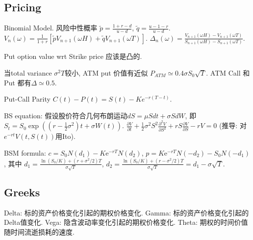 \documentclass[UTF8]{ctexart}
\begin{document}
\subsection{Pricing}

Binomial Model.
风险中性概率 $\widetilde{p} = \frac{1+r-d}{u-d}$, $\widetilde{q} = \frac{u-1-r}{u-d}$.
$V_n(\omega)=\frac{1}{1+r}[\widetilde{p}V_{n+1}(\omega H) + \widetilde{q}V_{n+1}(\omega T)]$.
$\Delta_n(\omega) = \frac{V_{n+1}(\omega H)-V_{n+1}(\omega T)}{S_{n+1}(\omega H)-S_{n+1}(\omega T)}$.


Put option value wrt Strike price 应该是凸的.

当total variance $\sigma^2 T$较小, ATM put 价值有近似 $P_{ATM}\simeq 0.4\sigma S_0\sqrt{T}$.
ATM Call 和 Put 都有$\Delta\simeq 0.5$.

Put-Call Parity $C(t)-P(t) = S(t) - Ke^{-r(T-t)}$.

BS equation: 假设股价符合几何布朗运动$dS=\mu S d t+\sigma S dW$, 即$S_t = S_0 \exp ((r-\frac{1}{2}\sigma^2)t+\sigma W(t))$.
$\frac{\partial V}{\partial t}+\frac{1}{2} \sigma^{2} S^{2} \frac{\partial^{2} V}{\partial S^{2}}+r S \frac{\partial V}{\partial S}-r V=0$
(推导: 对$e^{-rt}V(t,S(t))$用Ito).

BSM formula: 
$c=S_0 N\left(d_1\right)-K \mathrm{e}^{-r T} N\left(d_2\right) $, 
$p=K \mathrm{e}^{-r T} N\left(-d_2\right)-S_0 N\left(-d_1\right) $, 其中
$d_1=\frac{\ln \left(S_0 / K\right)+\left(r+\sigma^2 / 2\right) T}{\sigma \sqrt{T}} $, 
$d_2=\frac{\ln \left(S_0 / K\right)+\left(r-\sigma^2 / 2\right) T}{\sigma \sqrt{T}}=d_1-\sigma \sqrt{T}$. 


\subsection{Greeks}
Delta: 标的资产价格变化引起的期权价格变化.
Gamma: 标的资产价格变化引起的Delta值变化.
Vega: 隐含波动率变化引起的期权价格变化.
Theta: 期权的时间价值随时间流逝损耗的速度.
\end{document}
